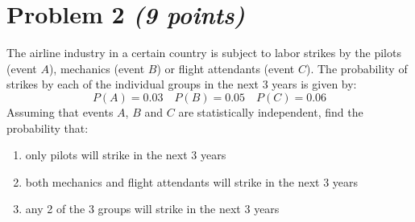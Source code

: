 \documentclass[11pt,twoside]{article}
\newcommand{\pts}[1]{\marginpar{ \small\hspace{0pt} \textit{[#1]} } }
\numberwithin{equation}{section}
\newcommand{\?}{\stackrel{?}{=}}
\newcommand{\gr}{\color{green!40!black}}
\begin{document}
  



  

  \eject

   \section*{Problem 2 \textit{(9 points)}}
   The airline industry in a certain country is subject to labor strikes by the
    pilots (event $A$), mechanics (event $B$) or flight attendants (event $C$).
    The probability of strikes by each of the individual groups in the next 3 years is given by:
    \[P(A) = 0.03\quad P(B) = 0.05\quad P(C) = 0.06\]
    Assuming that events $A$, $B$ and $C$ are statistically independent, find the probability that:

    \begin{enumerate}[\bf (a)]
    \item only pilots will strike in the next 3 years \pts{1} \vspace{25ex}
    \item both mechanics and flight attendants will strike in the next 3 years \pts{3} \vspace{25ex}
    \item any 2 of the 3 groups will strike in the next 3 years \pts{5} \vspace{25ex}
    \end{enumerate}
 
\end{document}

